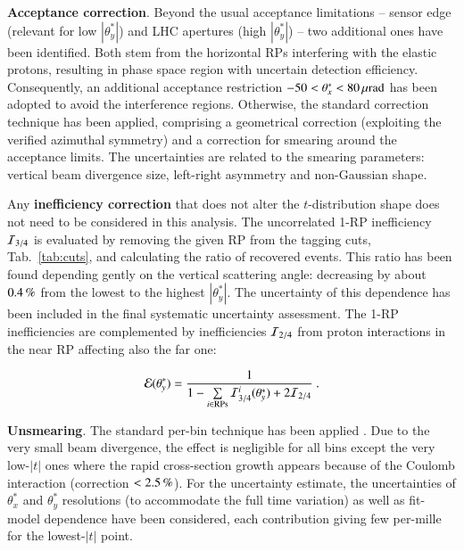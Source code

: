 
{\bf Acceptance correction}. Beyond the usual acceptance limitations -- sensor edge (relevant for low $|\theta^*_y|$) and LHC apertures (high $|\theta_y^*|$) -- two additional ones have been identified. Both stem from the horizontal RPs interfering with the elastic protons, resulting in phase space region with uncertain detection efficiency. Consequently, an additional acceptance restriction $-50 < \theta_x^* < 80\,{\rm \mu rad}$ has been adopted to avoid the interference regions. Otherwise, the standard correction technique \cite{8tev-90m} has been applied, comprising a geometrical correction (exploiting the verified azimuthal symmetry) and a correction for smearing around the acceptance limits. The uncertainties are related to the smearing parameters: vertical beam divergence size, left-right asymmetry and non-Gaussian shape.



Any {\bf inefficiency correction} that does not alter the $t$-distribution shape does not need to be considered in this analysis. The uncorrelated 1-RP inefficiency ${\cal I}_{3/4}$ is evaluated by removing the given RP from the tagging cuts, Tab.~\ref{tab:cuts}, and calculating the ratio of recovered events. This ratio has been found depending gently on the vertical scattering angle: decreasing by about $0.4\,{\rm \%}$ from the lowest to the highest $|\theta_y^*|$. The uncertainty of this dependence has been included in the final systematic uncertainty assessment. The 1-RP inefficiencies are complemented by inefficiencies ${\cal I}_{2/4}$ from proton interactions in the near RP affecting also the far one:

\begin{equation}
\label{efficiency}
	{\cal E}(\theta_y^*) = {1\over 1 - \sum\limits_{i\in \rm RPs} {\cal I}^i_{3/4}(\theta_y^*) + 2 {\cal I}_{2/4} } \ .
\end{equation}

{\bf Unsmearing}. The standard per-bin technique has been applied \cite{8tev-90m}. Due to the very small beam divergence, the effect is negligible for all bins except the very low-$|t|$ ones where the rapid cross-section growth appears because of the Coulomb interaction (correction $< 2.5\,{\rm \%}$). For the uncertainty estimate, the uncertainties of $\theta_x^*$ and $\theta_y^*$ resolutions (to accommodate the full time variation) as well as fit-model dependence have been considered, each contribution giving few per-mille for the lowest-$|t|$ point.

